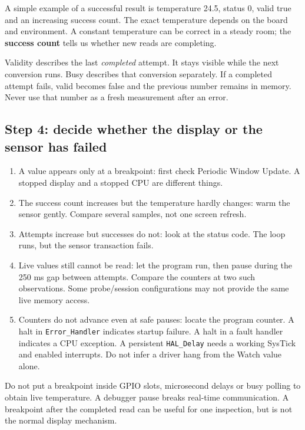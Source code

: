 A simple example of a successful result is temperature 24.5, status 0, valid true and an increasing success count. The exact temperature depends on the board and environment. A constant temperature can be correct in a steady room; the \textbf{success count} tells us whether new reads are completing.

Validity describes the last \emph{completed} attempt. It stays visible while the next conversion runs. Busy describes that conversion separately. If a completed attempt fails, valid becomes false and the previous number remains in memory. Never use that number as a fresh measurement after an error.


\subsection{Step 4: decide whether the display or the sensor has failed}
\begin{enumerate}
\item A value appears only at a breakpoint: first check Periodic Window Update. A stopped display and a stopped CPU are different things.
\item The success count increases but the temperature hardly changes: warm the sensor gently. Compare several samples, not one screen refresh.
\item Attempts increase but successes do not: look at the status code. The loop runs, but the sensor transaction fails.
\item Live values still cannot be read: let the program run, then pause during the 250 ms gap between attempts. Compare the counters at two such observations. Some probe/session configurations may not provide the same live memory access.
\item Counters do not advance even at safe pauses: locate the program counter. A halt in \texttt{Error\_Handler} indicates startup failure. A halt in a fault handler indicates a CPU exception. A persistent \texttt{HAL\_Delay} needs a working SysTick and enabled interrupts. Do not infer a driver hang from the Watch value alone.
\end{enumerate}
Do not put a breakpoint inside GPIO slots, microsecond delays or busy polling to obtain live temperature. A debugger pause breaks real-time communication. A breakpoint after the completed read can be useful for one inspection, but is not the normal display mechanism.

